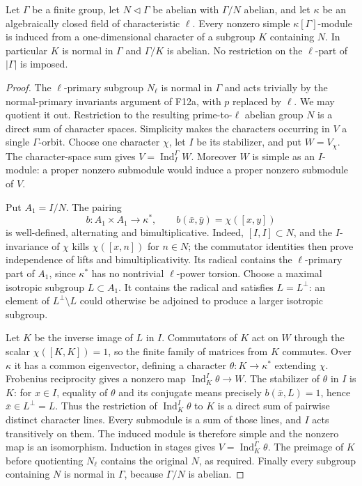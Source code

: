 \begin{lemma}
Let $\Gamma$ be a finite group, let $N\triangleleft\Gamma$ be
abelian with $\Gamma/N$ abelian, and let $\kappa$ be an algebraically
closed field of characteristic $\ell$. Every nonzero simple
$\kappa[\Gamma]$-module is induced from a one-dimensional character
of a subgroup $K$ containing $N$. In particular $K$ is normal in
$\Gamma$ and $\Gamma/K$ is abelian. No restriction on the
$\ell$-part of $|\Gamma|$ is imposed.
\end{lemma}
\begin{proof}
The $\ell$-primary subgroup $N_\ell$ is normal in $\Gamma$ and
acts trivially by the normal-primary invariants argument of F12a,
with $p$ replaced by $\ell$. We may quotient it out. Restriction
to the resulting prime-to-$\ell$ abelian group $N$ is a direct
sum of character spaces. Simplicity makes the characters occurring
in $V$ a single $\Gamma$-orbit. Choose one character $\chi$, let
$I$ be its stabilizer, and put $W=V_\chi$. The character-space
sum gives $V=\operatorname{Ind}_I^\Gamma W$. Moreover $W$ is
simple as an $I$-module: a proper nonzero submodule would induce
a proper nonzero submodule of $V$.

Put $A_1=I/N$. The pairing
\[
 b:A_1\times A_1\longrightarrow\kappa^*,\qquad
 b(\bar x,\bar y)=\chi([x,y])
 \tag{F13.2}
\]
is well-defined, alternating and bimultiplicative. Indeed,
$[I,I]\subset N$, and the $I$-invariance of $\chi$ kills
$\chi([x,n])$ for $n\in N$; the commutator identities then
prove independence of lifts and bimultiplicativity. Its radical
contains the $\ell$-primary part of $A_1$, since $\kappa^*$ has
no nontrivial $\ell$-power torsion. Choose a maximal isotropic
subgroup $L\subset A_1$. It contains the radical and satisfies
$L=L^\perp$: an element of $L^\perp\setminus L$ could otherwise
be adjoined to produce a larger isotropic subgroup.

Let $K$ be the inverse image of $L$ in $I$. Commutators of
$K$ act on $W$ through the scalar $\chi([K,K])=1$, so the
finite family of matrices from $K$ commutes. Over $\kappa$ it
has a common eigenvector, defining a character
$\theta:K\to\kappa^*$ extending $\chi$. Frobenius reciprocity
gives a nonzero map
$\operatorname{Ind}_K^I\theta\to W$.
The stabilizer of $\theta$ in $I$ is $K$: for $x\in I$, equality
of $\theta$ and its conjugate means precisely
$b(\bar x,L)=1$, hence $\bar x\in L^\perp=L$.
Thus the restriction of $\operatorname{Ind}_K^I\theta$ to
$K$ is a direct sum of pairwise distinct character lines.
Every submodule is a sum of those lines, and $I$ acts transitively
on them. The induced module is therefore simple and the nonzero
map is an isomorphism. Induction in stages gives
$V=\operatorname{Ind}_K^\Gamma\theta$.
The preimage of $K$ before quotienting $N_\ell$ contains the
original $N$, as required. Finally every subgroup containing $N$
is normal in $\Gamma$, because $\Gamma/N$ is abelian.
\end{proof}


